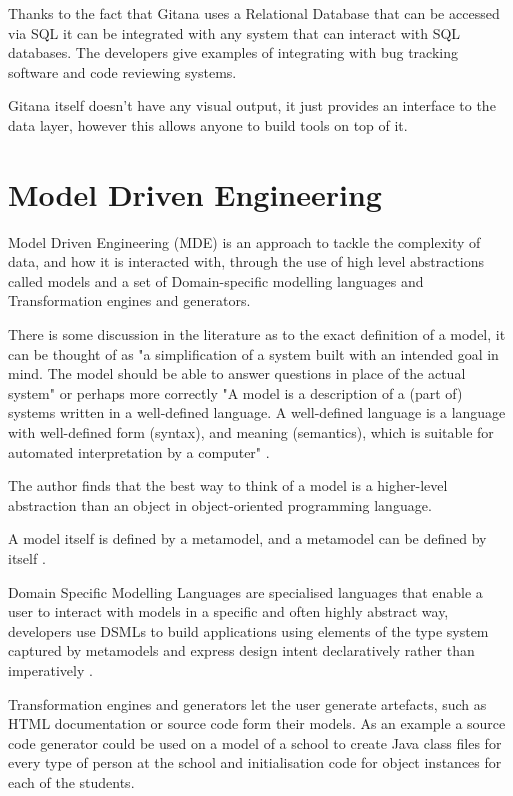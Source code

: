 \documentclass[11pt]{book}
\begin{document}
Thanks to the fact that Gitana uses a Relational Database that can be accessed via SQL it can be integrated with any system that can interact with SQL databases. The developers give examples of integrating with bug tracking software and code reviewing systems.

Gitana itself doesn't have any visual output, it just provides an interface to the data layer, however this allows anyone to build tools on top of it.

\section{Model Driven Engineering}
Model Driven Engineering (MDE) is an approach to tackle the complexity of data, and how it is interacted with, through the use of high level abstractions called models \cite{modeldrivenengineering} and a set of Domain-specific modelling languages and Transformation engines and generators. 

There is some discussion in the literature \cite{basictheorymde} as to the exact definition of a model, it can be thought of as "a simplification of a system built with an intended goal in mind. The model should be able to answer questions in place of the actual system" \cite{precisedefinitionmda} or perhaps more correctly "A model is a description of a (part of) systems written in a well-defined language. A well-defined language is a language with well-defined form (syntax), and meaning (semantics), which is suitable for automated interpretation by a computer" \cite{mdaexplained}.

The author finds that the best way to think of a model is a higher-level abstraction than an object in object-oriented programming language.

A model itself is defined by a metamodel, and a metamodel can be defined by itself \cite{metamodelling}. 

Domain Specific Modelling Languages are specialised languages that enable a user to interact with models in a specific and often highly abstract way, developers use DSMLs to build applications using elements of the type system captured by metamodels and express design intent declaratively rather than imperatively \cite{modeldrivenengineering}.

Transformation engines and generators let the user generate artefacts, such as HTML documentation or source code form their models. As an example a source code generator could be used on a model of a school to create Java class files for every type of person at the school and initialisation code for object instances for each of the students.
\end{document}
